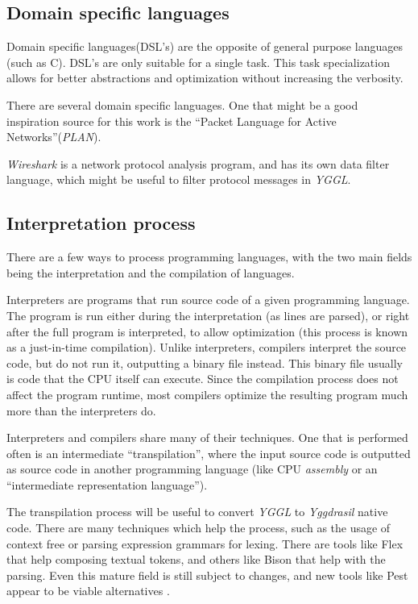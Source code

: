 \documentclass[runningheads]{../llncs}
\begin{document}
\subsection*{Domain specific languages}
Domain specific languages(DSL's) are the opposite of general purpose languages (such as C). DSL's are only suitable for a single task. This task specialization allows for better abstractions and optimization without increasing the verbosity.
\par There are several domain specific languages. One that might be a good inspiration source for this work is the ``Packet Language for Active Networks''(\textit{PLAN}). \par \textit{Wireshark} is a network protocol analysis program, and has its own data filter language, which might be useful to filter protocol messages in \textit{YGGL}.
\subsection*{Interpretation process}
There are a few ways to process programming languages, with the two main fields being the interpretation and the compilation of languages.
\par Interpreters are programs that run source code of a given programming language. The program is run either during the interpretation (as lines are parsed), or right after the full program is interpreted, to allow optimization (this process is known as a just-in-time compilation). Unlike interpreters, compilers interpret the source code, but do not run it, outputting a binary file instead. This binary file usually is code that the CPU itself can execute. Since the compilation process does not affect the program runtime, most compilers optimize the resulting program much more than the interpreters do.
\par Interpreters and compilers share many of their techniques. One that is performed often is an intermediate ``transpilation'', where the input source code is outputted as source code in another programming language (like CPU \textit{assembly} or an ``intermediate representation language'').
\par The transpilation process will be useful to convert \textit{YGGL} to \textit{Yggdrasil} native code. There are many techniques which help the process, such as the usage of context free or parsing expression grammars for lexing. There are tools like Flex that help composing textual tokens, and others like Bison that help with the parsing. Even this mature field is still subject to changes, and new tools like Pest appear to be viable alternatives \cite{AppelModernCompiler:1997,FlexBisonLevine:2009,Pest:2019}.
\end{document}
